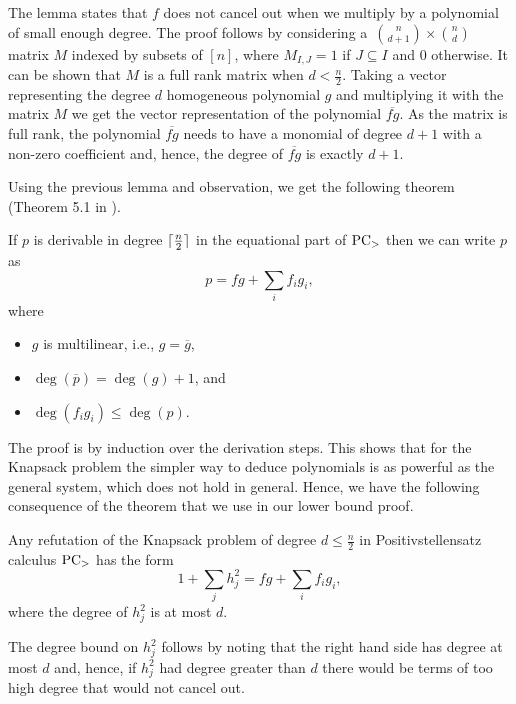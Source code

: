 \documentclass[a4paper,twoside,justified]{tufte-handout}
\begin{document}
The lemma states that $f$ does not cancel out when we multiply by a
polynomial of small enough degree. The proof follows by considering
a~$\binom{n}{d + 1} \times \binom{n}{d}$ matrix $M$ indexed by subsets
of $[n]$, where $M_{I, J} = 1$ if $J \subseteq I$ and $0$
otherwise. It can be shown that $M$ is a full rank
matrix\cite{gottlieb66IncidenceMatrices} when $d < \frac{n}{2}$.
Taking a vector representing the degree $d$ homogeneous polynomial $g$
and multiplying it with the matrix $M$ we get the vector
representation of the polynomial $\overline{f g}$. As the matrix is
full rank, the polynomial $\overline{f g}$ needs to have a monomial of
degree $d + 1$ with a non-zero coefficient and, hence, the degree of
$\overline{fg}$ is exactly $d + 1$.

Using the previous lemma and observation, we get the following theorem
(Theorem 5.1 in \cite{IPS99LowerBounds}).

\begin{theorem}
  If $p$ is derivable in degree $\lceil{}\frac{n}{2}\rceil{}$ in the equational
  part of $\mathrm{PC}_{>}$ then we can write $p$ as
  \begin{equation*}
    p = f g + \sum_i f_i g_i,
  \end{equation*}
  where
  \begin{itemize}
  \item $g$ is multilinear, i.e., $g = \overline{g}$,
  \item $\deg(\overline{p}) = \deg(g) + 1$, and
  \item $\deg(f_i g_i) \leq \deg(p)$.
  \end{itemize}
\end{theorem}

The proof is by induction over the derivation steps. This shows that
for the Knapsack problem the simpler way to deduce polynomials is as
powerful as the general system, which does not hold in general. Hence,
we have the following consequence of the theorem that we use in our
lower bound proof.

\begin{corollary}\label{cor:MainCorollary}
  Any refutation of the Knapsack problem of degree $d \leq
  \frac{n}{2}$ in Positivstellensatz calculus $\mathrm{PC}_{>}$ has the form
  \begin{equation*}
    1 + \sum_j h_j^2 = f g + \sum_i f_i g_i,
  \end{equation*}
  where the degree of $h_j^2$ is at most $d$.
\end{corollary}

The degree bound on $h_j^2$ follows by noting that the right hand side
has degree at most $d$ and, hence, if $h_j^2$ had degree greater than
$d$ there would be terms of too high degree that would not cancel out.
\end{document}
